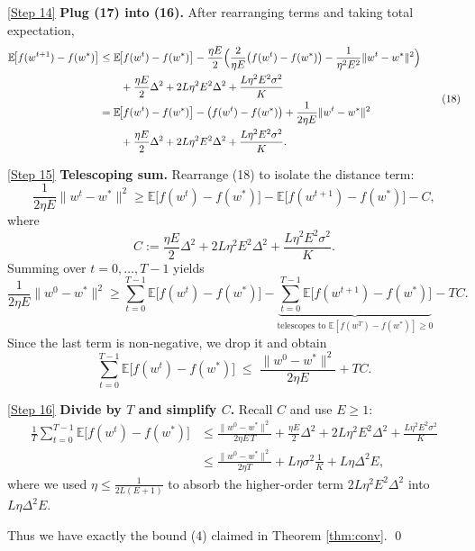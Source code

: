 \documentclass{article}
\newcommand{\E}{\mathbb{E}}
\begin{document}
\medskip
\noindent\underline{[Step 14]} \textbf{Plug (17) into (16).}  
After rearranging terms and taking total expectation,
\[
\begin{aligned}
\E\!\bigl[f(w^{t+1})-f(w^{*})\bigr]
&\le \E\!\bigl[f(w^{t})-f(w^{*})\bigr]
   -\frac{\eta E}{2}\Bigl(\frac{2}{\eta E}\bigl(f(w^{t})-f(w^{*})\bigr)-\frac{1}{\eta^{2}E^{2}}\|w^{t}-w^{*}\|^{2}\Bigr)\\
&\qquad+ \frac{\eta E}{2}\Delta^{2}
   +2L\eta^{2}E^{2}\Delta^{2}+ \frac{L\eta^{2}E^{2}\sigma^{2}}{K}\\
&= \E\!\bigl[f(w^{t})-f(w^{*})\bigr]
   -\bigl(f(w^{t})-f(w^{*})\bigr)
   +\frac{1}{2\eta E}\|w^{t}-w^{*}\|^{2}\\
&\qquad+ \frac{\eta E}{2}\Delta^{2}
   +2L\eta^{2}E^{2}\Delta^{2}+ \frac{L\eta^{2}E^{2}\sigma^{2}}{K}.
\end{aligned} \tag{18}
\]

\medskip
\noindent\underline{[Step 15]} \textbf{Telescoping sum.}  
Rearrange (18) to isolate the distance term:
\[
\frac{1}{2\eta E}\|w^{t}-w^{*}\|^{2}
\ge \E\!\bigl[f(w^{t})-f(w^{*})\bigr]
   -\E\!\bigl[f(w^{t+1})-f(w^{*})\bigr]
   - C,
\]
where
\[
C:=\frac{\eta E}{2}\Delta^{2}+2L\eta^{2}E^{2}\Delta^{2}+ \frac{L\eta^{2}E^{2}\sigma^{2}}{K}.
\]
Summing over $t=0,\dots,T-1$ yields
\[
\frac{1}{2\eta E}\|w^{0}-w^{*}\|^{2}
\ge \sum_{t=0}^{T-1}\E\!\bigl[f(w^{t})-f(w^{*})\bigr] - \underbrace{\sum_{t=0}^{T-1}\E\!\bigl[f(w^{t+1})-f(w^{*})\bigr]}_{\text{telescopes to } \E[f(w^{T})-f(w^{*})]\ge0}
   - T C .
\]
Since the last term is non‑negative, we drop it and obtain
\[
\sum_{t=0}^{T-1}\E\!\bigl[f(w^{t})-f(w^{*})\bigr]
\;\le\; \frac{\|w^{0}-w^{*}\|^{2}}{2\eta E}+ T C . \tag{19}
\]

\medskip
\noindent\underline{[Step 16]} \textbf{Divide by $T$ and simplify $C$.}  
Recall $C$ and use $E\ge1$:
\[
\begin{aligned}
\frac{1}{T}\sum_{t=0}^{T-1}\E\!\bigl[f(w^{t})-f(w^{*})\bigr]
&\le \frac{\|w^{0}-w^{*}\|^{2}}{2\eta E\,T}
   +\frac{\eta E}{2}\Delta^{2}+2L\eta^{2}E^{2}\Delta^{2}+ \frac{L\eta^{2}E^{2}\sigma^{2}}{K}\\
&\le \frac{\|w^{0}-w^{*}\|^{2}}{2\eta T}
   + L\eta\sigma^{2}\frac{1}{K}
   + L\eta\Delta^{2}E,
\end{aligned}
\]
where we used $\eta\le \frac{1}{2L(E+1)}$ to absorb the higher‑order term $2L\eta^{2}E^{2}\Delta^{2}$ into $L\eta\Delta^{2}E$.

Thus we have exactly the bound (4) claimed in Theorem \ref{thm:conv}. \qed
\end{document}
